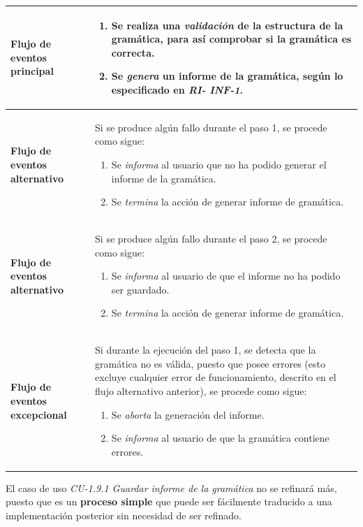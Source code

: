 \begin{longtable}[H]{|>{\columncolor[rgb]{0.63,0.79,0.95}}m{6cm} | m{8.5cm} |}
  \textbf{Flujo de eventos principal} & 
         \begin{enumerate}
         \item Se re\-a\-li\-za una \textit{validación} de la estructura de la gramática, para así  comprobar si la gramática es co\-rrec\-ta.
         \item Se \textit{genera} un informe de la gramática, según lo especificado en \textit{RI- INF-1}.
         \end{enumerate}\\ \hline             
  \textbf{Flujo de eventos alternativo} & Si se produce algún fallo durante el paso 1, se procede como sigue:
     \begin{enumerate}
     \item Se \textit{informa} al usuario que no ha podido generar el informe de la gramática.
     \item Se \textit{termina} la acción de generar informe de gramática.
     \end{enumerate}   \\ \hline              
  \textbf{Flujo de eventos alternativo} & Si se produce algún fallo durante el paso 2, se procede como sigue:
     \begin{enumerate}
     \item Se \textit{informa} al usuario de que el informe no ha podido ser guardado.
     \item Se \textit{termina} la acción de generar informe de gramática.
     \end{enumerate}  \\ \hline
  \textbf{Flujo de eventos excepcional} & Si durante la ejecución del paso 1, se detecta que la gramática no es válida, puesto que posee errores (esto excluye cualquier error de funcionamiento, descrito en el flujo alternativo anterior), se procede como sigue:
     \begin{enumerate}
     \item Se \textit{aborta} la generación del informe.
     \item Se \textit{informa} al usuario de que la gramática contiene errores.
     \end{enumerate}
   \label{tabla710}
 \end{longtable}

 El caso de uso \textit{CU-1.9.1 Guardar informe de la gramática} no se refinará más, puesto que es un \textbf{proceso simple} que puede ser fácilmente traducido a una implementación posterior sin necesidad de ser refinado.

